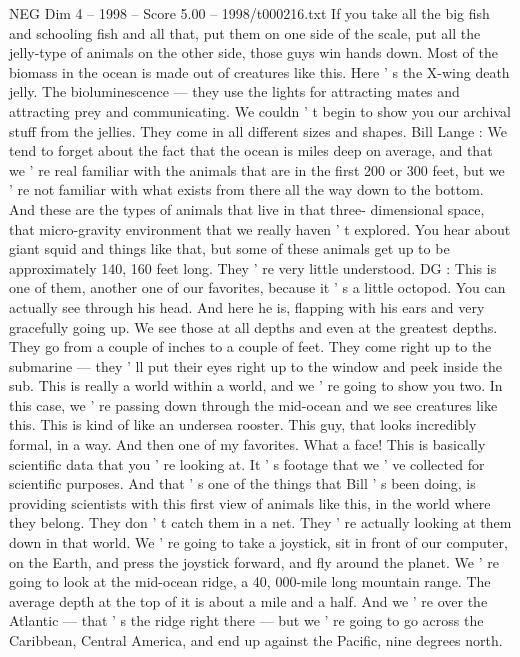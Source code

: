 \begin{textsample}{NEG Dim 4 – 1998 – Score 5.00 – 1998/t000216.txt}
If you take all the big fish and schooling fish and all that, put them on one side of the scale, put all the jelly-type of animals on the other side, those guys win hands down.
Most of the biomass in the ocean is made out of creatures like this.
Here ' s the X-wing death jelly.
The bioluminescence — they use the lights for attracting mates and attracting prey and communicating.
We couldn ' t begin to show you our archival stuff from the jellies.
They come in all different sizes and shapes.
Bill Lange : We tend to forget about the fact that the ocean is miles deep on average, and that we ' re real familiar with the animals that are in the first 200 or 300 feet, but we ' re not familiar with what exists from there all the way down to the bottom.
And these are the types of animals that live in that three- dimensional space, that micro-gravity environment that we really haven ' t explored.
You hear about giant squid and things like that, but some of these animals get up to be approximately 140, 160 feet long.
They ' re very little understood.
DG : This is one of them, another one of our favorites, because it ' s a little octopod.
You can actually see through his head.
And here he is, flapping with his ears and very gracefully going up.
We see those at all depths and even at the greatest depths.
They go from a couple of inches to a couple of feet.
They come right up to the submarine — they ' ll put their eyes right up to the window and peek inside the sub.
This is really a world within a world, and we ' re going to show you two.
In this case, we ' re passing down through the mid-ocean and we see creatures like this.
This is kind of like an undersea rooster.
This guy, that looks incredibly formal, in a way.
And then one of my favorites.
What a face!
This is basically scientific data that you ' re looking at.
It ' s footage that we ' ve collected for scientific purposes.
And that ' s one of the things that Bill ' s been doing, is providing scientists with this first view of animals like this, in the world where they belong.
They don ' t catch them in a net.
They ' re actually looking at them down in that world.
We ' re going to take a joystick, sit in front of our computer, on the Earth, and press the joystick forward, and fly around the planet.
We ' re going to look at the mid-ocean ridge, a 40, 000-mile long mountain range.
The average depth at the top of it is about a mile and a half.
And we ' re over the Atlantic — that ' s the ridge right there — but we ' re going to go across the Caribbean, Central America, and end up against the Pacific, nine degrees north.

\end{textsample}
